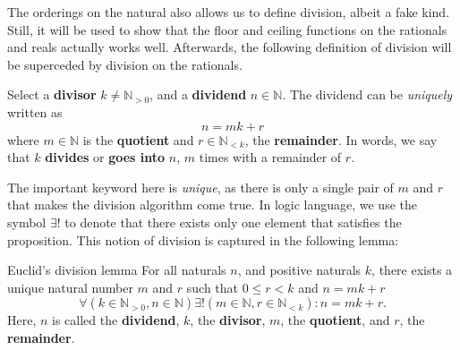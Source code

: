 The orderings on the natural also allows us to define division, albeit a fake kind. Still, it will
be used to show that the floor and ceiling functions on the rationals and reals actually works well.
Afterwards, the following definition of division will be superceded by division on the rationals.

Select a \textbf{divisor} \(k \neq \mathbb{N}_{>0}\), and a \textbf{dividend} \(n \in \mathbb{N}\).
The dividend can be \emph{uniquely} written as
\begin{equation}
  n = mk + r
\end{equation}
where \(m \in \mathbb{N}\) is the \textbf{quotient} and \(r \in \mathbb{N}_{<k}\), the
\textbf{remainder}. In words, we say that \(k\) \textbf{divides} or \textbf{goes into} \(n\), \(m\)
times with a remainder of \(r\).

The important keyword here is \emph{unique}, as there is only a single pair of \(m\) and \(r\) that
makes the division algorithm come true. In logic language, we use the symbol \(\exists !\) to denote
that there exists only one element that satisfies the proposition. This notion of division is
captured in the following lemma:

\begin{lemma}{Euclid's division lemma}{}
  For all naturals \(n\), and positive naturals \(k\), there exists a unique natural number \(m\)
  and \(r\) such that \(0 \leq r < k\) and \(n = mk + r\)
  \begin{equation}
    \forall (k \in \mathbb{N}_{>0}, n \in \mathbb{N}) \exists ! (m \in \mathbb{N}, r \in \mathbb{N}_{<k}) : n
    = mk + r.
  \end{equation}
  Here, \(n\) is called the \textbf{dividend}, \(k\), the \textbf{divisor}, \(m\), the
  \textbf{quotient}, and \(r\), the \textbf{remainder}.
\end{lemma}

